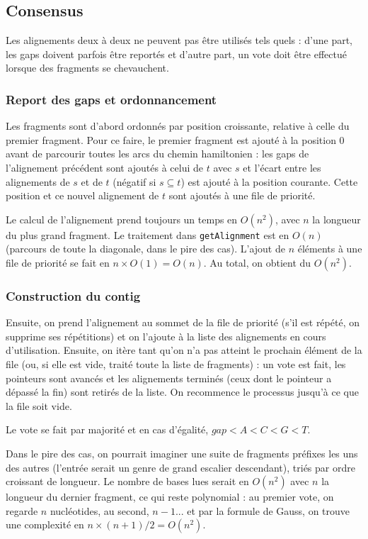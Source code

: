 \subsection{Consensus}
Les alignements deux à deux ne peuvent pas être utilisés tels quels :
d'une part, les gaps doivent parfois être reportés et
d'autre part, un vote doit être effectué lorsque des fragments se chevauchent.

\subsubsection{Report des gaps et ordonnancement}
Les fragments sont d'abord ordonnés par position croissante,
relative à celle du premier fragment.
Pour ce faire, le premier fragment est ajouté à la position 0 avant de
parcourir toutes les arcs  du chemin hamiltonien :
les gaps de l'alignement précédent sont ajoutés à celui de $t$ avec $s$ et
l'écart entre les alignements de $s$ et de $t$ (négatif si $s\subseteq t$) est
ajouté à la position courante. Cette position et ce nouvel alignement de $t$
sont ajoutés à une file de priorité.

Le calcul de l'alignement prend toujours un temps en $O(n^2)$, avec $n$ la
longueur du plus grand fragment. Le traitement dans \texttt{getAlignment}
est en $O(n)$ (parcours de toute la diagonale, dans le pire des cas).
L'ajout de $n$ éléments à une file de priorité se fait en $n\times O(1)=O(n)$.
Au total, on obtient du $O(n^2)$.

\subsubsection{Construction du contig}
Ensuite, on prend l'alignement au sommet de la file de priorité
(s'il est répété, on supprime ses répétitions) et on l'ajoute à
la liste des alignements en cours d'utilisation.
Ensuite, on itère tant qu'on n'a pas atteint le prochain élément de la file
(ou, si elle est vide, traité toute la liste de fragments) :
un vote est fait, les pointeurs sont avancés et les alignements terminés (ceux
dont le pointeur a dépassé la fin) sont retirés de la liste.
On recommence le processus jusqu'à ce que la file soit vide.

Le vote se fait par majorité et en cas d'égalité, $gap < A < C < G < T$.

Dans le pire des cas, on pourrait imaginer une suite de fragments préfixes les
uns des autres (l'entrée serait un genre de grand escalier descendant),
triés par ordre croissant de longueur. Le nombre de bases lues
serait en $O(n^2)$ avec $n$ la longueur du dernier fragment,
ce qui reste polynomial : au premier vote, on regarde $n$ nucléotides, au
second, $n-1$... et par la formule de Gauss, on trouve une complexité en
$n\times(n+1)/2=O(n^2)$.


